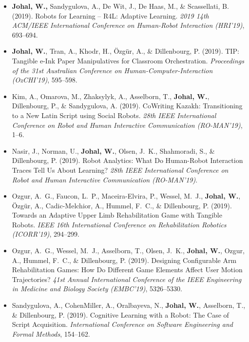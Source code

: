 \begin{itemize}[nosep]
    \item \textbf{Johal, W.,} Sandygulova, A., De Wit, J., De Haas, M., \& Scassellati, B. (2019). Robots for Learning -- R4L: Adaptive Learning. \textit{2019 14th ACM/IEEE International Conference on Human-Robot Interaction (HRI'19)}, 693--694.

    \item \textbf{Johal, W.}, Tran, A., Khodr, H., Özgür, A., \& Dillenbourg, P. (2019). TIP: Tangible e-Ink Paper Manipulatives for Classroom Orchestration. \textit{Proceedings of the 31st Australian Conference on Human-Computer-Interaction (OzCHI'19)}, 595--598.

    \item Kim, A., Omarova, M., Zhaksylyk, A., Asselborn, T., \textbf{Johal, W.}, Dillenbourg, P., \& Sandygulova, A. (2019). CoWriting Kazakh: Transitioning to a New Latin Script using Social Robots. \textit{28th IEEE International Conference on Robot and Human Interactive Communication (RO-MAN'19)}, 1--6.

    \item Nasir, J., Norman, U., \textbf{Johal, W.}, Olsen, J.\ K., Shahmoradi, S., \& Dillenbourg, P. (2019). Robot Analytics: What Do Human-Robot Interaction Traces Tell Us About Learning? \textit{28th IEEE International Conference on Robot and Human Interactive Communication (RO-MAN'19)}.

    \item Ozgur, A.\ G., Faucon, L.\ P., Maceira-Elvira, P., Wessel, M.\ J., \textbf{Johal, W.}, Özgür, A., Cadic-Melchior, A., Hummel, F.\ C., \& Dillenbourg, P. (2019). Towards an Adaptive Upper Limb Rehabilitation Game with Tangible Robots. \textit{IEEE 16th International Conference on Rehabilitation Robotics (ICORR'19)}, 294--299.

    \item Ozgur, A.\ G., Wessel, M.\ J., Asselborn, T., Olsen, J.\ K., \textbf{Johal, W.}, Ozgur, A., Hummel, F.\ C., \& Dillenbourg, P. (2019). Designing Configurable Arm Rehabilitation Games: How Do Different Game Elements Affect User Motion Trajectories? \textit{41st Annual International Conference of the IEEE Engineering in Medicine and Biology Society (EMBC'19)}, 5326--5330.

    \item Sandygulova, A., CohenMiller, A., Oralbayeva, N., \textbf{Johal, W.}, Asselborn, T., \& Dillenbourg, P. (2019). Cognitive Learning with a Robot: The Case of Script Acquisition. \textit{International Conference on Software Engineering and Formal Methods}, 154--162.


\end{itemize}
